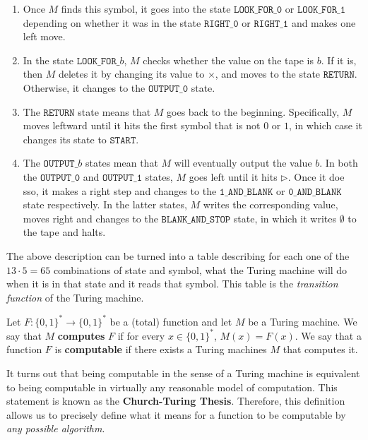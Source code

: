 \begin{example}
\begin{enumerate}
        \item Once $M$ finds this symbol, it goes into the state $\texttt{LOOK\_FOR\_0}$ or $\texttt{LOOK\_FOR\_1}$ depending on whether it was in the state $\texttt{RIGHT\_0}$ or $\texttt{RIGHT\_1}$ and makes one left move. 
        \item In the state $\texttt{LOOK\_FOR\_}b$, $M$ checks whether the value on the tape is $b$. If it is, then $M$ deletes it by changing its value to $\times$, and moves to the state $\texttt{RETURN}$. Otherwise, it changes to the $\texttt{OUTPUT\_0}$ state. 
        \item The $\texttt{RETURN}$ state means that $M$ goes back to the beginning. Specifically, $M$ moves leftward until it hits the first symbol that is not $0$ or $1$, in which case it changes its state to $\texttt{START}$. 
        \item The $\texttt{OUTPUT\_}b$ states mean that $M$ will eventually output the value $b$. In both the $\texttt{OUTPUT\_0}$ and $\texttt{OUTPUT\_1}$ states, $M$ goes left until it hits $\triangleright$. Once it doe sso, it makes a right step and changes to the $\texttt{1\_AND\_BLANK}$ or $\texttt{0\_AND\_BLANK}$ state respectively. In the latter states, $M$ writes the corresponding value, moves right and changes to the $\texttt{BLANK\_AND\_STOP}$ state, in which it writes $\emptyset$ to the tape and halts. 
    \end{enumerate}
    The above description can be turned into a table describing for each one of the $13 \cdot 5 = 65$ combinations of state and symbol, what the Turing machine will do when it is in that state and it reads that symbol. This table is the \textit{transition function} of the Turing machine. 
  \end{example}

  \begin{definition}
    Let $F: \{0,1\}^\ast \longrightarrow \{0,1\}^\ast$ be a (total) function and let $M$ be a Turing machine. We say that $M$ \textbf{computes} $F$ if for every $x \in \{0,1\}^\ast$, $M(x) = F(x)$. We say that a function $F$ is \textbf{computable} if there exists a Turing machines $M$ that computes it. 
  \end{definition}

  It turns out that being computable in the sense of a Turing machine is equivalent to being computable in virtually any reasonable model of computation. This statement is known as the \textbf{Church-Turing Thesis}. Therefore, this definition allows us to precisely define what it means for a function to be computable by \textit{any possible algorithm}. 

